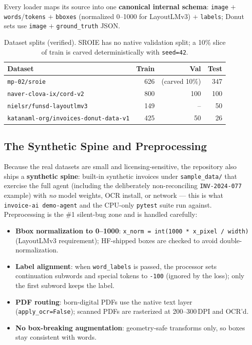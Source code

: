\documentclass[12pt,a4paper]{article}
\begin{document}
Every loader maps its source into one \textbf{canonical internal schema}: \texttt{image}
$+$ \texttt{words}/\texttt{tokens} $+$ \texttt{bboxes} (normalized 0--1000 for
LayoutLMv3) $+$ \texttt{labels}; Donut sets use \texttt{image} $+$ \texttt{ground\_truth}
JSON.

\begin{table}[H]
\centering
\caption{Dataset splits (verified). SROIE has no native validation split; a 10\% slice of train is carved deterministically with \texttt{seed=42}.}
\begin{tabular}{lrrr}
\toprule
\textbf{Dataset} & \textbf{Train} & \textbf{Val} & \textbf{Test} \\
\midrule
\texttt{mp-02/sroie}                   & 626  & (carved 10\%) & 347 \\
\texttt{naver-clova-ix/cord-v2}        & 800  & 100 & 100 \\
\texttt{nielsr/funsd-layoutlmv3}       & 149  & --  & 50 \\
\texttt{katanaml-org/invoices-donut-data-v1} & 425 & 50 & 26 \\
\bottomrule
\end{tabular}
\end{table}

\subsection{The Synthetic Spine and Preprocessing}

Because the real datasets are small and licensing-sensitive, the repository also ships a
\textbf{synthetic spine}: built-in synthetic invoices under \texttt{sample\_data/} that
exercise the full agent (including the deliberately non-reconciling
\texttt{INV-2024-077} example) with \emph{no} model weights, OCR install, or network ---
this is what \texttt{invoice-ai demo-agent} and the CPU-only \texttt{pytest} suite run
against. Preprocessing is the \#1 silent-bug zone and is handled carefully:
\begin{itemize}\setlength\itemsep{0.15em}
  \item \textbf{Bbox normalization to 0--1000}: \texttt{x\_norm = int(1000 * x\_pixel / width)} (LayoutLMv3 requirement); HF-shipped boxes are checked to avoid double-normalization.
  \item \textbf{Label alignment}: when \texttt{word\_labels} is passed, the processor sets continuation subwords and special tokens to \texttt{-100} (ignored by the loss); only the first subword keeps the label.
  \item \textbf{PDF routing}: born-digital PDFs use the native text layer (\texttt{apply\_ocr=False}); scanned PDFs are rasterized at 200--300\,DPI and OCR'd.
  \item \textbf{No box-breaking augmentation}: geometry-safe transforms only, so boxes stay consistent with words.
\end{itemize}
\end{document}
